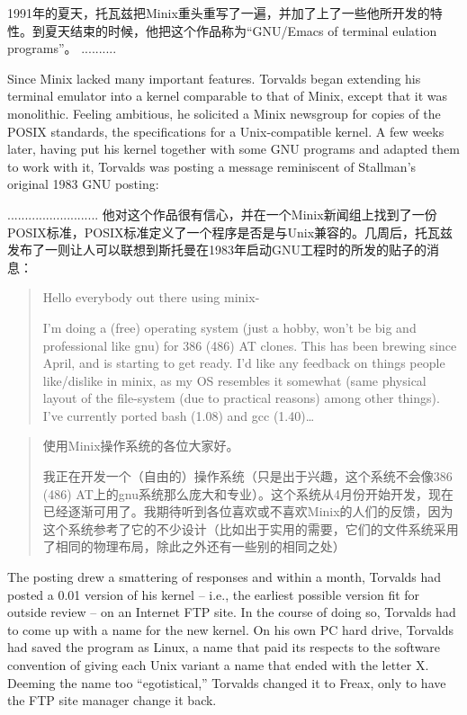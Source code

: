 \ifdefined\chs
1991年的夏天，托瓦兹把Minix重头重写了一遍，并加了上了一些他所开发的特性。到夏天结束的时候，他把这个作品称为``GNU/Emacs of terminal eulation programs''。 ..........
\fi

\ifdefined\eng
Since Minix lacked many important features. Torvalds began extending his terminal emulator into a kernel comparable to that of Minix, except that it was monolithic.  Feeling ambitious, he solicited a Minix newsgroup for copies of the POSIX standards, the specifications for a Unix-compatible kernel. A few weeks later, having put his kernel together with some GNU programs and adapted them to work with it, Torvalds was posting a message reminiscent of Stallman's original 1983 GNU posting:
\fi

\ifdefined\chs
..........................
他对这个作品很有信心，并在一个Minix新闻组上找到了一份POSIX标准，POSIX标准定义了一个程序是否是与Unix兼容的。几周后，托瓦兹发布了一则让人可以联想到斯托曼在1983年启动GNU工程时的所发的贴子的消息：
\fi

\ifdefined\eng
\begin{quote}
Hello everybody out there using minix-

I'm doing a (free) operating system (just a hobby, won't be big and professional like gnu) for 386 (486) AT clones. This has been brewing since April, and is starting to get ready. I'd like any feedback on things people like/dislike in minix, as my OS resembles it somewhat (same physical layout of the file-system (due to practical reasons) among other things).  I've currently ported bash (1.08) and gcc (1.40)\ldots{}
\end{quote}
\fi

\ifdefined\chs
\begin{quote}
使用Minix操作系统的各位大家好。

我正在开发一个（自由的）操作系统（只是出于兴趣，这个系统不会像386 (486) AT上的gnu系统那么庞大和专业）。这个系统从4月份开始开发，现在已经逐渐可用了。我期待听到各位喜欢或不喜欢Minix的人们的反馈，因为这个系统参考了它的不少设计（比如出于实用的需要，它们的文件系统采用了相同的物理布局，除此之外还有一些别的相同之处）
\end{quote}
\fi

\ifdefined\eng
The posting drew a smattering of responses and within a month, Torvalds had posted a 0.01 version of his kernel -- i.e., the earliest possible version fit for outside review -- on an Internet FTP site. In the course of doing so, Torvalds had to come up with a name for the new kernel. On his own PC hard drive, Torvalds had saved the program as Linux, a name that paid its respects to the software convention of giving each Unix variant a name that ended with the letter X. Deeming the name too ``egotistical,'' Torvalds changed it to Freax, only to have the FTP site manager change it back.
\fi

